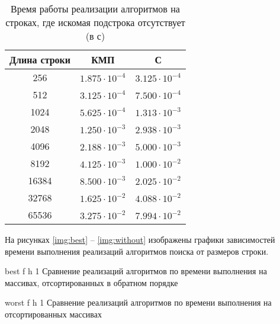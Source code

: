 \begin{table}[h]
	\begin{center}
		\begin{threeparttable}
			\captionsetup{justification=raggedright,singlelinecheck=off}
			\caption{Время работы реализации алгоритмов  на строках, где искомая подстрока отсутствует (в с)}
			\label{tbl:time_measurements_2}
			\begin{tabular}{|c|c|c|}
				\hline
				Длина строки &  КМП  & С \\
				\hline
				256 &$ 1.875\cdot 10^{-4} $&$ 3.125\cdot 10^{-4}$\\
				\hline
				512 &$ 3.125\cdot 10^{-4} $&$ 7.500\cdot 10^{-4}$\\
				\hline
				1024 &$ 5.625\cdot 10^{-4} $&$ 1.313\cdot 10^{-3}$\\
				\hline
				2048 &$ 1.250\cdot 10^{-3} $&$ 2.938\cdot 10^{-3}$\\
				\hline
				4096 &$ 2.188\cdot 10^{-3} $&$ 5.000\cdot 10^{-3}$\\
				\hline
				8192 &$ 4.125\cdot 10^{-3} $&$ 1.000\cdot 10^{-2}$\\
				\hline
				16384 &$ 8.500\cdot 10^{-3} $&$ 2.025\cdot 10^{-2}$\\
				\hline
				32768 &$ 1.625\cdot 10^{-2} $&$ 4.088\cdot 10^{-2}$\\
				\hline
				65536 &$ 3.275\cdot 10^{-2} $&$ 7.994\cdot 10^{-2}$\\
				\hline
				
			\end{tabular}
		\end{threeparttable}
	\end{center}
\end{table}

\clearpage
На рисунках \ref{img:best} -- \ref{img:without} изображены графики зависимостей времени выполнения реализаций алгоритмов поиска от размеров строки.

{best} %
{f} %
{h} %
{1\textwidth} %
{Сравнение реализаций алгоритмов по времени выполнения на массивах, отсортированных в обратном порядке} %

{worst} %
{f} %
{h} %
{1\textwidth} %
{Сравнение реализаций алгоритмов по времени выполнения на отсортированных массивах} %


